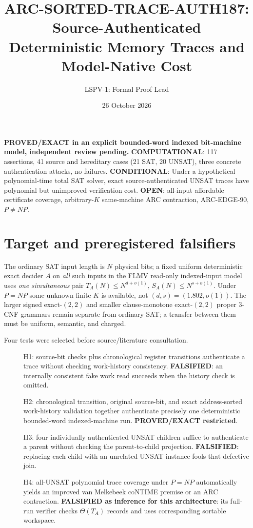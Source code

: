 \documentclass[11pt]{article}
\title{ARC-SORTED-TRACE-AUTH187: Source-Authenticated Deterministic Memory Traces and Model-Native Cost}
\author{LSPV-1: Formal Proof Lead}
\date{26 October 2026}
\begin{document}
\maketitle
\begin{center}
\textbf{PROVED/EXACT in an explicit bounded-word indexed bit-machine model, independent review pending.}
\textbf{COMPUTATIONAL}: 117 assertions, 41 source and hereditary cases (21 SAT, 20 UNSAT), three concrete authentication attacks, no failures.
\textbf{CONDITIONAL}: Under a hypothetical polynomial-time total SAT solver, exact source-authenticated UNSAT traces have polynomial but unimproved verification cost.
\textbf{OPEN}: all-input affordable certificate coverage, arbitrary-$K$ same-machine ARC contraction, ARC-EDGE-90, $P\ne NP$.
\end{center}

\section{Target and preregistered falsifiers}
The ordinary SAT input length is $N$ physical bits; a fixed uniform deterministic exact decider $A$ on \emph{all} such inputs in the FLMV read-only indexed-input model uses \emph{one simultaneous} pair $T_A(N)\le N^{d+o(1)}$, $S_A(N)\le N^{s+o(1)}$. Under $P=NP$ some unknown finite $K$ is available, not $(d,s)=(1.802,o(1))$. The larger signed exact-$(2,2)$ and smaller clause-monotone exact-$(2,2)$ proper 3-CNF grammars remain separate from ordinary SAT; a transfer between them must be uniform, semantic, and charged.

Four tests were selected before source/literature consultation.
\begin{description}
\item[] H1: source-bit checks plus chronological register transitions authenticate a trace without checking work-history consistency. \textbf{FALSIFIED}: an internally consistent fake work read succeeds when the history check is omitted.
\item[] H2: chronological transition, original source-bit, and exact address-sorted work-history validation together authenticate precisely one deterministic bounded-word indexed-machine run. \textbf{PROVED/EXACT restricted}.
\item[] H3: four individually authenticated UNSAT children suffice to authenticate a parent without checking the parent-to-child projection. \textbf{FALSIFIED}: replacing each child with an unrelated UNSAT instance fools that defective join.
\item[] H4: all-UNSAT polynomial trace coverage under $P=NP$ automatically yields an improved van Melkebeek coNTIME premise or an ARC contraction. \textbf{FALSIFIED as inference for this architecture}: its full-run verifier checks $\Theta(T_A)$ records and uses corresponding sortable workspace.
\end{description}
\end{document}
